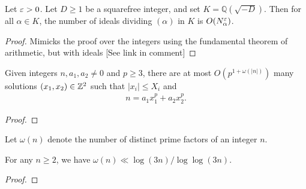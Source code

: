 \begin{lemma} \label{lem:DivisorBoundQuadField}
  Let $\varepsilon>0$. Let $D\ge1$ be a squarefree integer, and set $K=\mathbb{Q}(\sqrt{-D})$.
  Then for all $\alpha\in K$, the number of ideals dividing $(\alpha)$ in $K$
  is $O(N_\alpha^\varepsilon)$.
\end{lemma}
\begin{proof}
  Mimicks the proof over the integers
  using the fundamental theorem of arithmetic, but with ideals
  [See link in comment] %
\end{proof}

\begin{theorem} \label{thm:BombierSchmidtforThueEqs}
  Given integers $n,a_1,a_2\neq0$ and $p\ge3$, there are
  at most $O(p^{1+\omega(|n|)})$ many solutions
  $(x_1,x_2)\in\mathbb{Z}^2$ such that $|x_i|\le X_i$ and
  \begin{align*}
    n = a_1 x_1^p + a_2 x_2^p.
  \end{align*}
\end{theorem}
\begin{proof}
\end{proof}


\begin{definition}\label{def:omega}
Let $\omega(n)$ denote the number of distinct prime factors of an integer $n$.
\end{definition}

\begin{lemma} \label{lem:omegaUpperBound} 
For any $n\ge2$, we have $\omega(n) \ll \log(3n)/\log\log(3n)$.
\end{lemma}
\begin{proof}
\end{proof}

